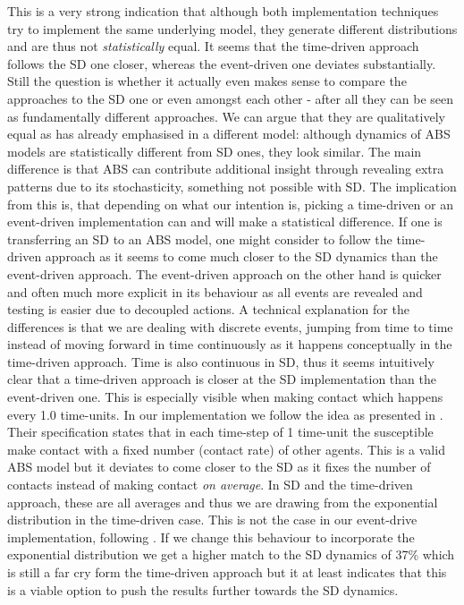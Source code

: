 This is a very strong indication that although both implementation techniques try to implement the same underlying model, they generate different distributions and are thus not \textit{statistically} equal. It seems that the time-driven approach follows the SD one closer, whereas the event-driven one deviates substantially. 
Still the question is whether it actually even makes sense to compare the approaches to the SD one or even amongst each other - after all they can be seen as fundamentally different approaches. We can argue that they are qualitatively equal as \cite{figueredo_comparing_2014} has already emphasised in a different model: although dynamics of ABS models are statistically different from SD ones, they look similar. The main difference is that ABS can contribute additional insight through revealing extra patterns due to its stochasticity, something not possible with SD.
The implication from this is, that depending on what our intention is, picking a time-driven or an event-driven implementation can and will make a statistical difference. If one is transferring an SD to an ABS model, one might consider to follow the time-driven approach as it seems to come much closer to the SD dynamics than the event-driven approach. The event-driven approach on the other hand is quicker and often much more explicit in its behaviour as all events are revealed and testing is easier due to decoupled actions.
A technical explanation for the differences is that we are dealing with discrete events, jumping from time to time instead of moving forward in time continuously as it happens conceptually in the time-driven approach. Time is also continuous in SD, thus it seems intuitively clear that a time-driven approach is closer at the SD implementation than the event-driven one. This is especially visible when making contact which happens every 1.0 time-units.
In our implementation we follow the idea as presented in \cite{macal_agent-based_2010}. Their specification states that in each time-step of 1 time-unit the susceptible make contact with a fixed number (contact rate) of other agents. This is a valid ABS model but it deviates to come closer to the SD as it fixes the number of contacts instead of making contact \textit{on average}. In SD and the time-driven approach, these are all averages and thus we are drawing from the exponential distribution in the time-driven case. This is not the case in our event-drive implementation, following \cite{macal_agent-based_2010}. If we change this behaviour to incorporate the exponential distribution we get a higher match to the SD dynamics of 37\% which is still a far cry form the time-driven approach but it at least indicates that this is a viable option to push the results further towards the SD dynamics. 

